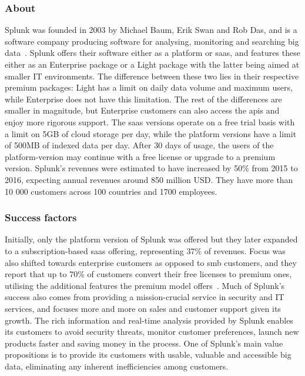 \subsubsection{About}
Splunk was founded in 2003 by Michael Baum, Erik Swan and Rob Das, and is a software company producing software for analysing, monitoring and searching big data~\cite{derrickharris2010}. Splunk offers their software either as a platform or \gls{saas}, and features these either as an Enterprise package or a Light package with the latter being aimed at smaller IT environments. The difference between these two lies in their respective premium packages: Light has a limit on daily data volume and maximum users, while Enterprise does not have this limitation. The rest of the differences are smaller in magnitude, but Enterprise customers can also access the \glspl{api} and enjoy more rigorous support. The \gls{saas} versions operate on a free trial basis with a limit on 5GB of cloud storage per day, while the platform versions have a limit of 500MB of indexed data per day. After 30 days of usage, the users of the platform-version may continue with a free license or upgrade to a premium version. Splunk's revenues were estimated to have increased by 50\% from 2015 to 2016, expecting annual revenues around 850 million USD. They have more than 10 000 customers across 100 countries and 1700 employees.

\subsubsection{Success factors}
Initially, only the platform version of Splunk was offered but they later expanded to a subscription-based \gls{saas} offering, representing 37\% of revenues. Focus was also shifted towards enterprise customers as opposed to \gls{smb} customers, and they report that up to 70\% of customers convert their free licenses to premium ones, utilising the additional features the premium model offers~\cite{philiplay2014}. Much of Splunk's success also comes from providing a mission-crucial service in security and IT services, and focuses more and more on sales and customer support given its growth. The rich information and real-time analysis provided by Splunk enables its customers to avoid security threats, monitor customer preferences, launch new products faster and saving money in the process. One of Splunk's main value propositions is to provide its customers with usable, valuable and accessible big data, eliminating any inherent inefficiencies among customers. 